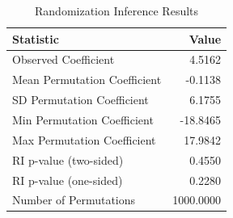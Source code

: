\begin{table}[!h]
\centering
\caption{\label{tab:tab:ri}Randomization Inference Results}
\centering
\begin{tabular}[t]{lr}
\toprule
Statistic & Value\\
\midrule
Observed Coefficient & 4.5162\\
Mean Permutation Coefficient & -0.1138\\
SD Permutation Coefficient & 6.1755\\
Min Permutation Coefficient & -18.8465\\
Max Permutation Coefficient & 17.9842\\
\addlinespace
RI p-value (two-sided) & 0.4550\\
RI p-value (one-sided) & 0.2280\\
Number of Permutations & 1000.0000\\
\bottomrule
\end{tabular}
\end{table}

